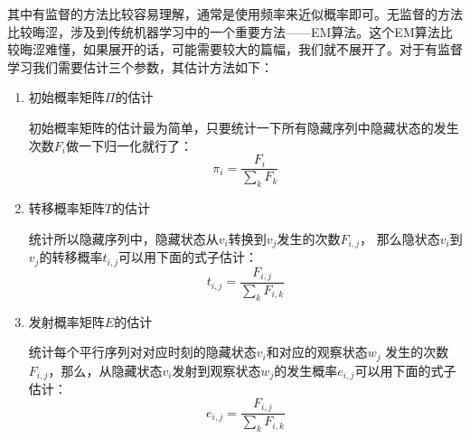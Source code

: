 \documentclass[twoside,a4paper,12pt]{book}%
\begin{document}
其中有监督的方法比较容易理解，通常是使用频率来近似概率即可。无监督的方法比较晦涩，涉及到传统机器学习中的一个重要方法——EM算法。这个EM算法比较晦涩难懂，如果展开的话，可能需要较大的篇幅，我们就不展开了。对于有监督学习我们需要估计三个参数，其估计方法如下：
\begin{enumerate}
\item 初始概率矩阵$\Pi$的估计

初始概率矩阵的估计最为简单，只要统计一下所有隐藏序列中隐藏状态的发生次数$F_i$做一下归一化就行了：
$$
\pi_{i}=\frac{F_{i}}{\sum_{k}{F_{k}}}
$$
\item 转移概率矩阵$T$的估计

统计所以隐藏序列中，隐藏状态从$v_i$转换到$v_j$发生的次数$F_{i,j}$， 那么隐状态$v_i$到$v_j$的转移概率$
t_{i,j}$可以用下面的式子估计：
$$
t_{i,j}=\frac{F_{i,j}}{\sum_{k}{F_{i,k}}}
$$
\item 发射概率矩阵$E$的估计

统计每个平行序列对对应时刻的隐藏状态$v_i$和对应的观察状态$w_j$ 发生的次数$F_{i,j}$，那么，从隐藏状态$v_i$发射到观察状态$w_j$的发生概率$e_{i,j}$可以用下面的式子估计：
$$
e_{i,j}=\frac{F_{i,j}}{\sum_{k}{F_{i,k}}}
$$

\end{enumerate}
\end{document}
